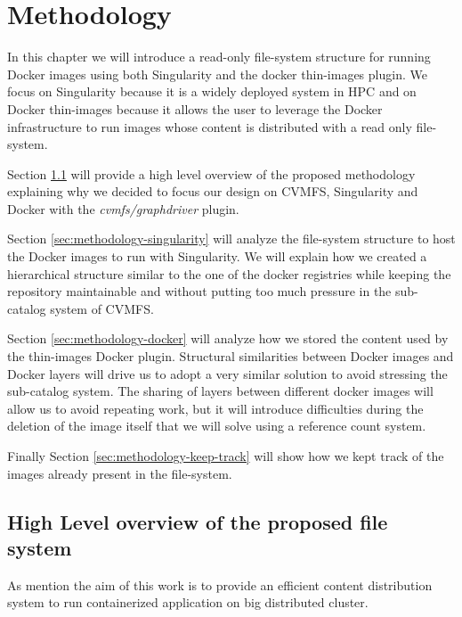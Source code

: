 \chapter{Methodology}\label{ch:Methodology}

In this chapter we will introduce a read-only file-system structure for
running Docker images using both Singularity and the docker thin-images plugin.
We focus on Singularity because it is a widely deployed system in HPC and on
Docker thin-images because it allows the user to leverage the Docker infrastructure
to run images whose content is distributed with a read only file-system.

Section \ref{sec:methodology-high-level} will provide a high level overview of
the proposed methodology explaining why we decided to focus our design on CVMFS,
Singularity and Docker with the \textit{cvmfs/graphdriver} plugin.

Section \ref{sec:methodology-singularity} will analyze the file-system
structure to host the Docker images to run with Singularity. We will explain
how we created a hierarchical structure similar to the one of the docker
registries while keeping the repository maintainable and without putting too
much pressure in the sub-catalog system of CVMFS.

Section \ref{sec:methodology-docker} will analyze how we stored the content used
by the thin-images Docker plugin. Structural similarities between Docker images
and Docker layers will drive us to adopt a very similar solution to avoid
stressing the sub-catalog system. The sharing of layers between different
docker images will allow us to avoid repeating work, but it will introduce
difficulties during the deletion of the image itself that we will solve using a
reference count system.

Finally Section \ref{sec:methodology-keep-track} will show how we kept
track of the images already present in the file-system.

\section{High Level overview of the proposed file system}
\label{sec:methodology-high-level}

As mention the aim of this work is to provide an efficient content distribution
system to run containerized application on big distributed cluster.  

